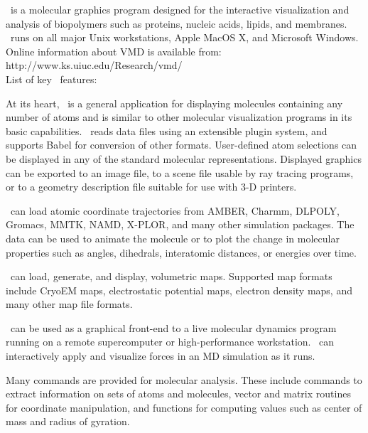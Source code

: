\VMD\ is a molecular graphics program designed for the
interactive visualization and analysis of biopolymers such as proteins,
nucleic acids, lipids, and membranes.  \VMD\ runs on all major 
Unix workstations, Apple MacOS X, and Microsoft Windows.
Online information about VMD is available from:
\\ 
		   {http://www.ks.uiuc.edu/Research/vmd/}
\vspace{0.1in}
\\
List of key \VMD\ features:
\begin{itemize}
   At its heart, \VMD\
is a general application for displaying molecules containing
any number of atoms and is similar to other molecular visualization 
programs in its basic capabilities.
\VMD\ reads data files using an extensible plugin system, and supports
Babel\mycite{}{} for conversion of other formats.
User-defined atom selections can be displayed in any of the
standard molecular representations.
Displayed graphics can be exported to an image file, 
to a scene file usable by ray tracing programs, or to
a geometry description file suitable for use with 3-D printers.

\VMD\ can load atomic coordinate trajectories from 
AMBER, Charmm, DLPOLY, Gromacs, MMTK, NAMD, X-PLOR, and many other 
simulation packages.  The data can be used to animate the molecule or 
to plot the change in molecular properties such as angles, dihedrals, 
interatomic distances, or energies over time.

\VMD\ can load, generate, and display, volumetric maps.  Supported
map formats include CryoEM maps, electrostatic potential maps, 
electron density maps, and many other map file formats.

\VMD\ can be used as a graphical front-end to a live molecular
dynamics program running on a remote supercomputer or
high-performance workstation.  \VMD\ can interactively apply
and visualize forces in an MD simulation as it runs.

Many commands are provided for molecular analysis.  
These include commands to extract information on sets of atoms and molecules, 
vector and matrix routines for coordinate manipulation, and 
functions for computing values such as center of mass and radius 
of gyration.


\end{itemize}
